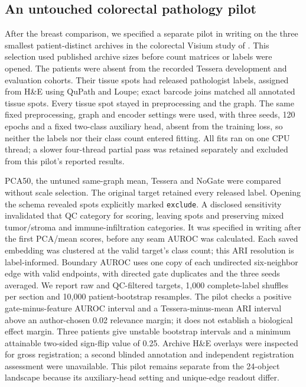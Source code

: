\documentclass[11pt]{article}
\begin{document}
\subsection{An untouched colorectal pathology pilot}
After the breast comparison, we specified a separate pilot in writing on the three smallest patient-distinct archives in the colorectal Visium study of \citet{valdeolivas2024crc}. This selection used published archive sizes before count matrices or labels were opened. The patients were absent from the recorded Tessera development and evaluation cohorts. Their \CrcTissueSpots{} tissue spots had \CrcLabeledSpots{} released pathologist labels, assigned from H\&E using QuPath and Loupe; exact barcode joins matched all annotated tissue spots. Every tissue spot stayed in preprocessing and the graph. The same fixed preprocessing, graph and encoder settings were used, with three seeds, 120 epochs and a fixed two-class auxiliary head, absent from the training loss, so neither the labels nor their class count entered fitting. All fits ran on one CPU thread; a slower four-thread partial pass was retained separately and excluded from this pilot's reported results.

PCA50, the untuned same-graph mean, Tessera and NoGate were compared without scale selection. The original target retained every released label. Opening the schema revealed \CrcQcExcluded{} spots explicitly marked \texttt{exclude}. A disclosed sensitivity invalidated that QC category for scoring, leaving \CrcQcSpots{} spots and preserving mixed tumor/stroma and immune-infiltration categories. It was specified in writing after the first PCA/mean scores, before any seam AUROC was calculated. Each saved embedding was clustered at the valid target's class count; this ARI resolution is label-informed. Boundary AUROC uses one copy of each undirected six-neighbor edge with valid endpoints, with directed gate duplicates and the three seeds averaged. We report raw and QC-filtered targets, 1,000 complete-label shuffles per section and 10,000 patient-bootstrap resamples. The pilot checks a positive gate-minus-feature AUROC interval and a Tessera-minus-mean ARI interval above an author-chosen 0.02 relevance margin; it does not establish a biological effect margin. Three patients give unstable bootstrap intervals and a minimum attainable two-sided sign-flip value of 0.25. Archive H\&E overlays were inspected for gross registration; a second blinded annotation and independent registration assessment were unavailable. This pilot remains separate from the 24-object landscape because its auxiliary-head setting and unique-edge readout differ.
\end{document}
